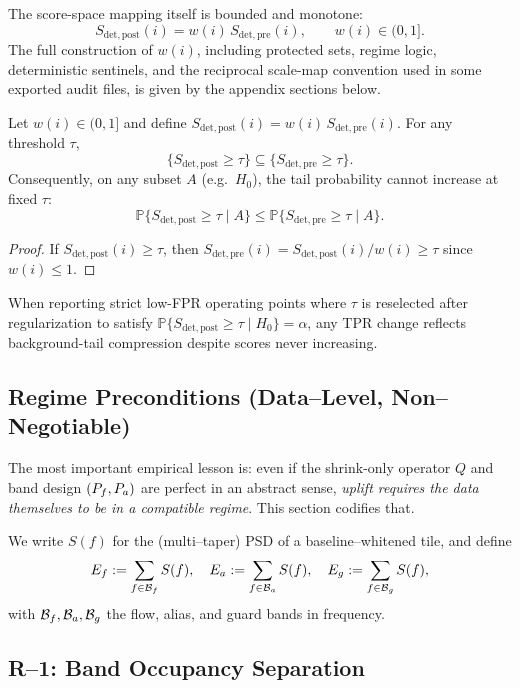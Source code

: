 The score-space mapping itself is bounded and monotone:
\[
  S_{\mathrm{det,post}}(i)=w(i)\,S_{\mathrm{det,pre}}(i),\qquad w(i)\in(0,1].
\]
The full construction of $w(i)$, including protected sets, regime logic, deterministic sentinels, and the reciprocal scale-map convention used in some exported audit files, is given by the appendix sections below.

\begin{lemma}
\label{lem:shrink_only_monotonicity}
Let $w(i)\in(0,1]$ and define $S_{\mathrm{det,post}}(i)=w(i)\,S_{\mathrm{det,pre}}(i)$. For any threshold $\tau$,
\[
  \{S_{\mathrm{det,post}}\ge\tau\}\subseteq \{S_{\mathrm{det,pre}}\ge\tau\}.
\]
Consequently, on any subset $A$ (e.g.\ $H_0$), the tail probability cannot increase at fixed $\tau$:
\[
  \mathbb{P}\{S_{\mathrm{det,post}}\ge\tau\mid A\}\le \mathbb{P}\{S_{\mathrm{det,pre}}\ge\tau\mid A\}.
\]
\end{lemma}
\begin{proof}
If $S_{\mathrm{det,post}}(i)\ge\tau$, then $S_{\mathrm{det,pre}}(i)=S_{\mathrm{det,post}}(i)/w(i)\ge\tau$ since $w(i)\le 1$.
\end{proof}

When reporting strict low-FPR operating points where $\tau$ is reselected after regularization to satisfy $\mathbb{P}\{S_{\mathrm{det,post}}\ge\tau\mid H_0\}=\alpha$, any TPR change reflects background-tail compression despite scores never increasing.

\subsection{Regime Preconditions (Data--Level, Non--Negotiable)}
\label{sec:regime}

The most important empirical lesson is: even if the shrink-only operator $Q$ and band design $(P_f,P_a)$ are perfect in an abstract sense, \emph{uplift requires the data themselves to be in a compatible regime}. This section codifies that.

We write $S(f)$ for the (multi--taper) PSD of a baseline--whitened tile, and define
\[
E_f := \sum_{f\in\mathcal{B}_f} S(f),\quad
E_a := \sum_{f\in\mathcal{B}_a} S(f),\quad
E_g := \sum_{f\in\mathcal{B}_g} S(f),
\]
with $\mathcal{B}_f,\mathcal{B}_a,\mathcal{B}_g$ the flow, alias, and guard bands in frequency.

\subsection{R--1: Band Occupancy Separation}

